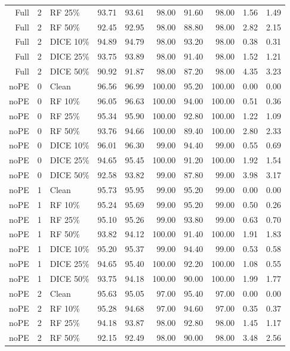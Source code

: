 {\begin{longtable}{rllrrrrrrr}
Full & 2 & RF 25\% & 93.71 & 93.61 & 98.00 & 91.60 & 98.00 & 1.56 & 1.49 \\
Full & 2 & RF 50\% & 92.45 & 92.95 & 98.00 & 88.80 & 98.00 & 2.82 & 2.15 \\
Full & 2 & DICE 10\% & 94.89 & 94.79 & 98.00 & 93.20 & 98.00 & 0.38 & 0.31 \\
Full & 2 & DICE 25\% & 93.75 & 93.89 & 98.00 & 91.40 & 98.00 & 1.52 & 1.21 \\
Full & 2 & DICE 50\% & 90.92 & 91.87 & 98.00 & 87.20 & 98.00 & 4.35 & 3.23 \\
noPE & 0 & Clean & 96.56 & 96.99 & 100.00 & 95.20 & 100.00 & 0.00 & 0.00 \\
noPE & 0 & RF 10\% & 96.05 & 96.63 & 100.00 & 94.00 & 100.00 & 0.51 & 0.36 \\
noPE & 0 & RF 25\% & 95.34 & 95.90 & 100.00 & 92.80 & 100.00 & 1.22 & 1.09 \\
noPE & 0 & RF 50\% & 93.76 & 94.66 & 100.00 & 89.40 & 100.00 & 2.80 & 2.33 \\
noPE & 0 & DICE 10\% & 96.01 & 96.30 & 99.00 & 94.40 & 99.00 & 0.55 & 0.69 \\
noPE & 0 & DICE 25\% & 94.65 & 95.45 & 100.00 & 91.20 & 100.00 & 1.92 & 1.54 \\
noPE & 0 & DICE 50\% & 92.58 & 93.82 & 99.00 & 87.80 & 99.00 & 3.98 & 3.17 \\
noPE & 1 & Clean & 95.73 & 95.95 & 99.00 & 95.20 & 99.00 & 0.00 & 0.00 \\
noPE & 1 & RF 10\% & 95.24 & 95.69 & 99.00 & 95.20 & 99.00 & 0.50 & 0.26 \\
noPE & 1 & RF 25\% & 95.10 & 95.26 & 99.00 & 93.80 & 99.00 & 0.63 & 0.70 \\
noPE & 1 & RF 50\% & 93.82 & 94.12 & 100.00 & 91.40 & 100.00 & 1.91 & 1.83 \\
noPE & 1 & DICE 10\% & 95.20 & 95.37 & 99.00 & 94.40 & 99.00 & 0.53 & 0.58 \\
noPE & 1 & DICE 25\% & 94.65 & 95.40 & 100.00 & 92.20 & 100.00 & 1.08 & 0.55 \\
noPE & 1 & DICE 50\% & 93.75 & 94.18 & 100.00 & 90.00 & 100.00 & 1.99 & 1.77 \\
noPE & 2 & Clean & 95.63 & 95.05 & 97.00 & 95.40 & 97.00 & 0.00 & 0.00 \\
noPE & 2 & RF 10\% & 95.28 & 94.68 & 97.00 & 94.60 & 97.00 & 0.35 & 0.37 \\
noPE & 2 & RF 25\% & 94.18 & 93.87 & 98.00 & 92.80 & 98.00 & 1.45 & 1.17 \\
noPE & 2 & RF 50\% & 92.15 & 92.49 & 98.00 & 90.00 & 98.00 & 3.48 & 2.56 \\

\end{longtable}}
